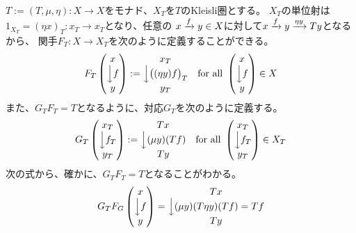 {	$T:=(T,\mu,\eta):X\to X$をモナド、$X_T$を$T$のKleisli圏とする。
	$X_T$の単位射は$1_{X_T}=(\eta x)_T:x_T\to x_T$となり、任意の
	$x\xrightarrow[{}]{f}y\in X$に対して$x\xrightarrow[{}]{f}y\xrightarrow[{}]{\eta y}Ty$となるから、
	関手$F_T:X\to X_T$を次のように定義することができる。
	\begin{equation*}\begin{split}
		F_T \begin{pmatrix}
			x \\ \Big\downarrow{f} \\ y
		\end{pmatrix} := \begin{matrix}
			x_T \\ \Big\downarrow{\mathinner{\bigl({(\eta y)f}\bigr)}_T} \\ y_T
		\end{matrix} \quad\text{for all } \begin{pmatrix}
			x \\ \Big\downarrow{f} \\ y
		\end{pmatrix}\in X
	\end{split}\end{equation*}
	また、$G_TF_T=T$となるように、対応$G_T$を次のように定義する。
	\begin{equation*}\begin{split}
		G_T \begin{pmatrix}
			x_T \\ \Big\downarrow{f_T} \\ y_T
		\end{pmatrix} := \begin{matrix}
			Tx \\ \Big\downarrow{(\mu y)(Tf)} \\ Ty
		\end{matrix} \quad\text{for all } \begin{pmatrix}
			x_T \\ \Big\downarrow{f_T} \\ y_T
		\end{pmatrix}\in X_T
	\end{split}\end{equation*}
	次の式から、確かに、$G_TF_T=T$となることがわかる。
	\begin{equation*}\begin{split}
		G_TF_G \begin{pmatrix}
			x \\ \Big\downarrow{f} \\ y
		\end{pmatrix} = \begin{matrix}
			Tx \\ \Big\downarrow{(\mu y)(T\eta y)(Tf)=Tf} \\ Ty

\end{matrix}
\end{split}
\end{equation*}}
